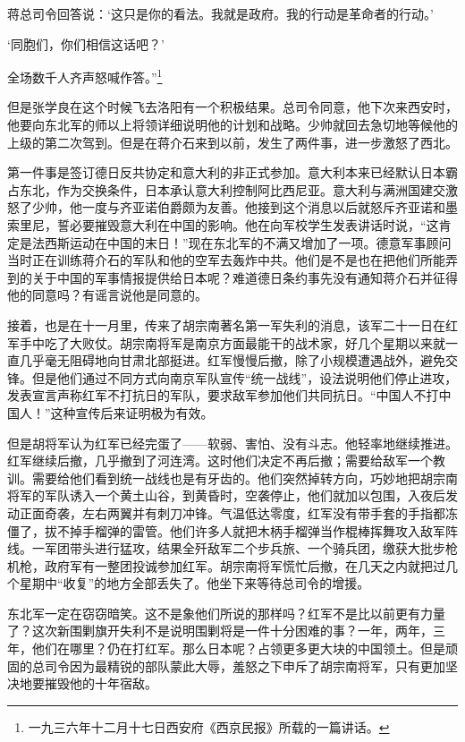 \documentclass[10pt]{book}
\begin{document}
蒋总司令回答说：‘这只是你的看法。我就是政府。我的行动是革命者的行动。’

‘同胞们，你们相信这话吧？’

全场数千人齐声怒喊作答。”\footnote{一九三六年十二月十七日西安府《西京民报》所载的一篇讲话。}

但是张学良在这个时候飞去洛阳有一个积极结果。总司令同意，他下次来西安时，他要向东北军的师以上将领详细说明他的计划和战略。少帅就回去急切地等候他的上级的第二次驾到。但是在蒋介石来到以前，发生了两件事，进一步激怒了西北。

第一件事是签订德日反共协定和意大利的非正式参加。意大利本来已经默认日本霸占东北，作为交换条件，日本承认意大利控制阿比西尼亚。意大利与满洲国建交激怒了少帅，他一度与齐亚诺伯爵颇为友善。他接到这个消息以后就怒斥齐亚诺和墨索里尼，誓必要摧毁意大利在中国的影响。他在向军校学生发表讲话时说，“这肯定是法西斯运动在中国的末日！”现在东北军的不满又增加了一项。德意军事顾问当时正在训练蒋介石的军队和他的空军去轰炸中共。他们是不是也在把他们所能弄到的关于中国的军事情报提供给日本呢？难道德日条约事先没有通知蒋介石并征得他的同意吗？有谣言说他是同意的。

接着，也是在十一月里，传来了胡宗南著名第一军失利的消息，该军二十一日在红军手中吃了大败仗。胡宗南将军是南京方面最能干的战术家，好几个星期以来就一直几乎毫无阻碍地向甘肃北部挺进。红军慢慢后撤，除了小规模遭遇战外，避免交锋。但是他们通过不同方式向南京军队宣传“统一战线”，设法说明他们停止进攻，发表宣言声称红军不打抗日的军队，要求敌军参加他们共同抗日。“中国人不打中国人！”这种宣传后来证明极为有效。

但是胡将军认为红军已经完蛋了——软弱、害怕、没有斗志。他轻率地继续推进。红军继续后撤，几乎撤到了河连湾。这时他们决定不再后撤；需要给敌军一个教训。需要给他们看到统一战线也是有牙齿的。他们突然掉转方向，巧妙地把胡宗南将军的军队诱入一个黄土山谷，到黄昏时，空袭停止，他们就加以包围，入夜后发动正面奇袭，左右两翼并有刺刀冲锋。气温低达零度，红军没有带手套的手指都冻僵了，拔不掉手榴弹的雷管。他们许多人就把木柄手榴弹当作棍棒挥舞攻入敌军阵线。一军团带头进行猛攻，结果全歼敌军二个步兵旅、一个骑兵团，缴获大批步枪机枪，政府军有一整团投诚参加红军。胡宗南将军慌忙后撤，在几天之内就把过几个星期中“收复”的地方全部丢失了。他坐下来等待总司令的增援。

东北军一定在窃窃暗笑。这不是象他们所说的那样吗？红军不是比以前更有力量了？这次新围剿旗开失利不是说明围剿将是一件十分困难的事？一年，两年，三年，他们在哪里？仍在打红军。那么日本呢？占领更多更大块的中国领土。但是顽固的总司令因为最精锐的部队蒙此大辱，羞怒之下申斥了胡宗南将军，只有更加坚决地要摧毁他的十年宿敌。
\end{document}

